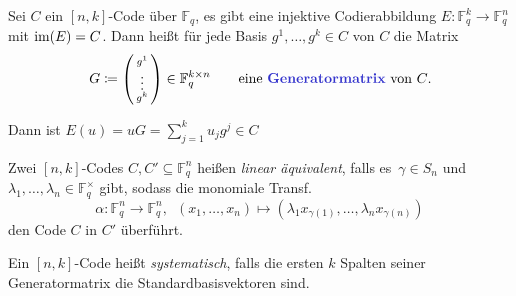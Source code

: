 \documentclass{cheat-sheet}
\newcommand{\F}{\mathbb{F}} %
\begin{document}



\begin{defn}
  Sei $C$ ein $[n,k]$-Code über $\F_q$, \dh{} es gibt eine injektive Codierabbildung $E : \F_q^k \to \F_q^n$ mit $\operatorname{im}(E) = C$.
  Dann heißt für jede Basis $g^1, \ldots, g^k \in C$ von $C$ die Matrix
  \[
    G \coloneqq \begin{psmallmatrix}
      g^1 \\ \vdots \\ g^k
    \end{psmallmatrix} \in \F_q^{k \times n} \qquad
    \text{eine \emph{Generatormatrix} von $C$.}
  \]
\end{defn}

\begin{bem}
  Dann ist $E(u) = uG = \sum_{j=1}^k u_j g^j \in C$
\end{bem}


\begin{defn}
  Zwei $[n,k]$-Codes $C, C' \subseteq \F_q^n$ heißen \emph{linear äquivalent}, falls es~$\gamma \in S_n$ und $\lambda_1, \ldots, \lambda_n \in \F_q^{\times}$ gibt, sodass die monomiale Transf. \[ \alpha : \F_q^n \to \F_q^n, \enspace (x_1, \ldots, x_n) \mapsto (\lambda_1 x_{\gamma(1)}, \ldots, \lambda_n x_{\gamma(n)}) \]
  den Code $C$ in $C'$ überführt.
\end{defn}

\iffalse
\begin{bspe}
  binäre $[5, 2, 3]$-Codes
  
  $C_1$ hat Generatormatrix $G_1 = \begin{psmallmatrix}
    11100 \\
    00111
  \end{psmallmatrix}$,
  $C_1 = \{ 00000, 111100, 00111, 11011 \}$
  
  $C_2$ hat Generatormatrix $G_2 = \begin{psmallmatrix}
    011001 \\
    10110
  \end{psmallmatrix}$
  $C_2 = \{ 00000, 01101, 10110, 11011 \}$
\end{bspe}
\fi

\begin{defn}
  Ein $[n,k]$-Code heißt \emph{systematisch}, falls die ersten $k$ Spalten seiner Generatormatrix die Standardbasisvektoren sind.
\end{defn}
\end{document}
